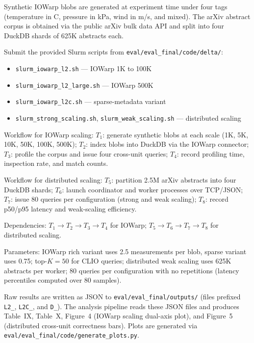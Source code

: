 \documentclass[conference]{IEEEtran}
\begin{document}

Synthetic IOWarp blobs are generated at experiment time under four tags (temperature in \textdegree C, pressure in kPa, wind in m/s, and mixed). The arXiv abstract corpus is obtained via the public arXiv bulk data API and split into four DuckDB shards of 625K abstracts each.


Submit the provided Slurm scripts from \texttt{eval/eval\_final/code/delta/}:
\begin{itemize}
\item \texttt{slurm\_iowarp\_l2.sh} --- IOWarp 1K to 100K
\item \texttt{slurm\_iowarp\_l2\_large.sh} --- IOWarp 500K
\item \texttt{slurm\_iowarp\_l2c.sh} --- sparse-metadata variant
\item \texttt{slurm\_strong\_scaling.sh}, \texttt{slurm\_weak\_scaling.sh} --- distributed scaling
\end{itemize}

\artcomp

Workflow for IOWarp scaling:
$T_1$: generate synthetic blobs at each scale (1K, 5K, 10K, 50K, 100K, 500K);
$T_2$: index blobs into DuckDB via the IOWarp connector;
$T_3$: profile the corpus and issue four cross-unit queries;
$T_4$: record profiling time, inspection rate, and match counts.

Workflow for distributed scaling:
$T_5$: partition 2.5M arXiv abstracts into four DuckDB shards;
$T_6$: launch coordinator and worker processes over TCP/JSON;
$T_7$: issue 80 queries per configuration (strong and weak scaling);
$T_8$: record p50/p95 latency and weak-scaling efficiency.

Dependencies: $T_1 \rightarrow T_2 \rightarrow T_3 \rightarrow T_4$ for IOWarp; $T_5 \rightarrow T_6 \rightarrow T_7 \rightarrow T_8$ for distributed scaling.

Parameters: IOWarp rich variant uses 2.5 measurements per blob, sparse variant uses 0.75; top-$K{=}50$ for CLIO queries; distributed weak scaling uses 625K abstracts per worker; 80 queries per configuration with no repetitions (latency percentiles computed over 80 samples).

\artout

Raw results are written as JSON to \texttt{eval/eval\_final/outputs/} (files prefixed \texttt{L2\_}, \texttt{L2C\_}, and \texttt{D\_}). The analysis pipeline reads these JSON files and produces Table~IX, Table~X, Figure~4 (IOWarp scaling dual-axis plot), and Figure~5 (distributed cross-unit correctness bars). Plots are generated via \texttt{eval/eval\_final/code/generate\_plots.py}.
\end{document}

